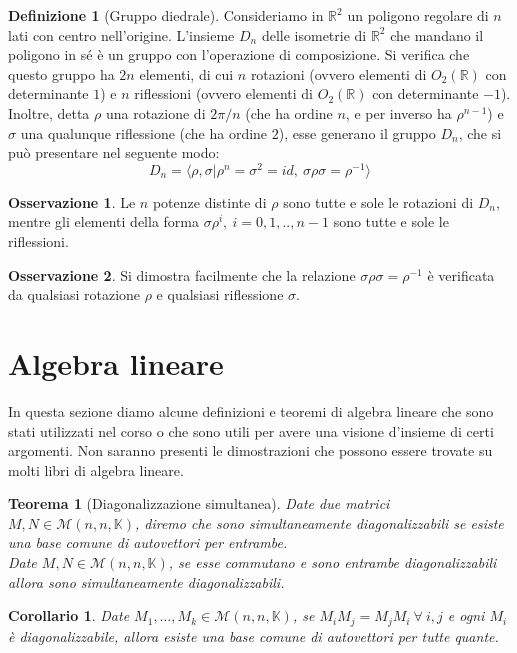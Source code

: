 \documentclass[11pt]{article}
\theoremstyle{plain}
\newtheorem{thm}{Teorema}[section]
\newtheorem*{cor}{Corollario}
\theoremstyle{definition}
\newtheorem{defn}{Definizione}[section]
\newtheorem*{rem}{Osservazione}
\theoremstyle{remark}
\newcommand{\R}{\mathbb{R}}
\newcommand{\K}{\mathbb{K}}
\begin{document}
\begin{defn}[Gruppo diedrale]
Consideriamo in $\R^2$ un poligono regolare di $n$ lati con centro nell'origine.
L'insieme $D_n$ delle isometrie di $\R^2$ che mandano il poligono in sé è un gruppo con l'operazione di composizione.
Si verifica che questo gruppo ha $2n$ elementi, di cui $n$ rotazioni (ovvero elementi di $O_2(\R)$ con determinante $1$)
e $n$ riflessioni (ovvero elementi di $O_2(\R)$ con determinante $-1$).
Inoltre, detta $\rho$ una rotazione di $2\pi/n$ (che ha ordine $n$, e per inverso ha $\rho^{n-1}$) e $\sigma$ una qualunque riflessione (che ha ordine $2$), esse generano
il gruppo $D_n$, che si può presentare nel seguente modo: $$D_n=\langle\rho,\sigma|\rho^n=\sigma^2=id,\ \sigma\rho\sigma=\rho^{-1}\rangle$$
\end{defn}

\begin{rem}
 Le $n$ potenze distinte di $\rho$ sono tutte e sole le rotazioni di $D_n$, mentre gli elementi della forma $\sigma\rho^{i},\ i=0,1,..,n-1$ 
 sono tutte e sole le riflessioni. 
\end{rem}

\begin{rem}
 Si dimostra facilmente che la relazione $\sigma\rho\sigma=\rho^{-1}$ è verificata da qualsiasi rotazione $\rho$
 e qualsiasi riflessione $\sigma$.
\end{rem}











\newpage
\section{Algebra lineare}
In questa sezione diamo alcune definizioni e teoremi di algebra lineare che sono stati utilizzati nel corso o che sono utili per avere una visione d'insieme di certi argomenti. Non saranno presenti le dimostrazioni che possono essere trovate su molti libri di algebra lineare.
\begin{thm}[Diagonalizzazione simultanea]
\label{thm:diag_sim}
	Date due matrici $M, N\in \mathcal{M}(n,n,\K)$, diremo che sono \textit{simultaneamente diagonalizzabili} se esiste una base comune di autovettori per entrambe.\\
	Date $M, N\in \mathcal{M}(n,n,\K)$, se esse commutano e sono entrambe diagonalizzabili allora sono simultaneamente diagonalizzabili.
\end{thm}
\begin{cor}
	Date $M_1,\ldots,M_k \in \mathcal{M}(n,n,\K)$, se $M_iM_j=M_jM_i\ \forall\ i, j$ e ogni $M_i$ è diagonalizzabile, allora esiste una base comune di autovettori per tutte quante.
\end{cor}
\end{document}
